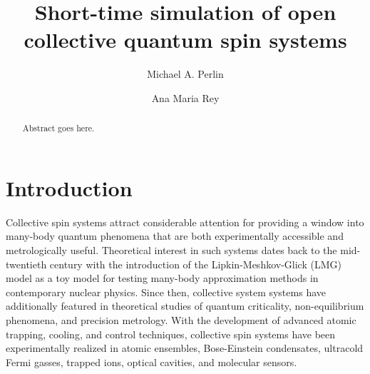 \documentclass[pra,reprint,longbibliography]{revtex4-1}
\newcommand{\1}{\mathds{1}}
\begin{document}
\title{Short-time simulation of open collective quantum spin systems}

\author{Michael A. Perlin}
\author{Ana Maria Rey}

\begin{abstract}
  Abstract goes here.
\end{abstract}

\maketitle


\section{Introduction}

Collective spin systems attract considerable attention for providing a
window into many-body quantum phenomena that are both experimentally
accessible\cite{takano2009spin, chen2010heralded,
  riedel2010atomchipbased, gross2010nonlinear, martin2013quantum,
  bohnet2016quantum, hosten2016quantum, norcia2018cavitymediated,
  jones2009magnetic} and metrologically
useful\cite{riedel2010atomchipbased, gross2010nonlinear,
  hosten2016quantum, jones2009magnetic, zhong2010simplified,
  huang2015quantum, agarwal1997atomic, lau2014proposal,
  wineland1992spin, kitagawa1993squeezed, ma2011quantum}.  Theoretical
interest in such systems dates back to the mid-twentieth century with
the introduction of the Lipkin-Meshkov-Glick (LMG) model as a toy
model for testing many-body approximation methods in contemporary
nuclear physics\cite{lipkin1965validity, meshkov1965validity,
  glick1965validity}.  Since then, collective system systems have
additionally featured in theoretical studies of quantum
criticality\cite{latorre2005entanglement, alcalde2007functional,
  morrison2008collective, sarandy2009classical, wang2012quantum,
  majd2014lmg}, non-equilibrium
phenomena\cite{morrison2008dissipationdriven,
  bhattacherjee2014nonequilibrium, klinder2015dynamical,
  zhiqiang2017nonequilibrium, smale2018observation}, and precision
metrology\cite{wineland1992spin, kitagawa1993squeezed, ma2011quantum,
  zhong2010simplified}.  With the development of advanced atomic
trapping, cooling, and control techniques, collective spin systems
have been experimentally realized in atomic
ensembles\cite{takano2009spin, chen2010heralded}, Bose-Einstein
condensates\cite{riedel2010atomchipbased, gross2010nonlinear},
ultracold Fermi gasses\cite{martin2013quantum}, trapped
ions\cite{bohnet2016quantum}, optical cavities\cite{hosten2016quantum,
  norcia2018cavitymediated}, and molecular
sensors\cite{jones2009magnetic}.
\end{document}
